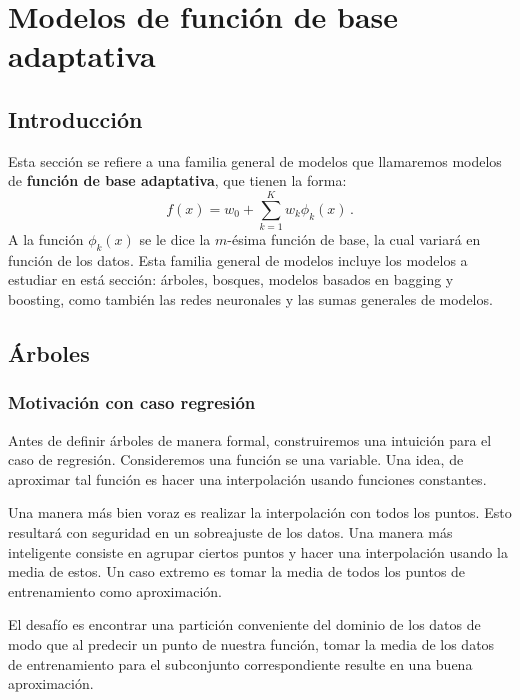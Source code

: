 \section{Modelos de función de base adaptativa}
\label{cap:adaptativa}

\subsection{Introducción}
\label{sec:intro_adap}

Esta sección se refiere a una familia general de modelos que llamaremos modelos de \textbf{función de base adaptativa}, que tienen la forma:
\begin{equation}
    f(x) = w_0 + \sum^K_{k=1} w_k \phi_k(x) \,. 
\end{equation}
A la función $\phi_k(x)$ se le dice la $m$-ésima función de base, la cual variará en función de los datos. Esta familia general de modelos incluye los modelos a estudiar en está sección: árboles, bosques, modelos basados en bagging y boosting, como también las redes neuronales y las sumas generales de modelos.


\subsection{Árboles}
\label{sec:arbol}

\subsubsection{Motivación con caso regresión}

Antes de definir árboles de manera formal, construiremos una intuición para el caso de regresión. Consideremos una función se una variable. Una idea, de aproximar tal función es hacer una interpolación usando funciones constantes.


Una manera más bien voraz es realizar la interpolación con todos los puntos. Esto resultará con seguridad en un sobreajuste de los datos. Una manera más inteligente consiste en agrupar ciertos puntos y hacer una interpolación usando la media de estos. Un caso extremo es tomar la media de todos los puntos de entrenamiento como aproximación.

El desafío es encontrar una partición conveniente del dominio de los datos de modo que al predecir un punto de nuestra función, tomar la media de los datos de entrenamiento para el subconjunto correspondiente resulte en una buena aproximación.

